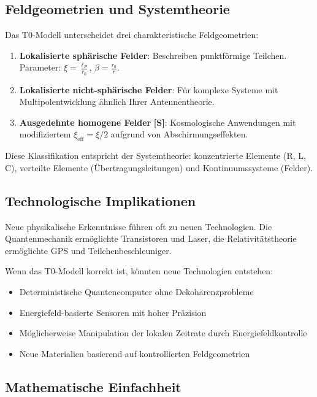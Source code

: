 \subsection{Feldgeometrien und Systemtheorie}

Das T0-Modell unterscheidet drei charakteristische Feldgeometrien:

\begin{enumerate}
	\item \textbf{Lokalisierte sphärische Felder}: Beschreiben punktförmige Teilchen. Parameter: $\xi = \frac{\ell_P}{r_0}$, $\beta = \frac{r_0}{r}$.
	\item \textbf{Lokalisierte nicht-sphärische Felder}: Für komplexe Systeme mit Multipolentwicklung ähnlich Ihrer Antennentheorie.
	\item \textbf{Ausgedehnte homogene Felder} \textbf{[S]}: Kosmologische Anwendungen mit modifiziertem $\xi_{\text{eff}} = \xi/2$ aufgrund von Abschirmungseffekten.
\end{enumerate}

Diese Klassifikation entspricht der Systemtheorie: konzentrierte Elemente (R, L, C), verteilte Elemente (Übertragungsleitungen) und Kontinuumssysteme (Felder).

\subsection{Technologische Implikationen}

Neue physikalische Erkenntnisse führen oft zu neuen Technologien. Die Quantenmechanik ermöglichte Transistoren und Laser, die Relativitätstheorie ermöglichte GPS und Teilchenbeschleuniger.

Wenn das T0-Modell korrekt ist, könnten neue Technologien entstehen:
\begin{itemize}
	\item Deterministische Quantencomputer ohne Dekohärenzprobleme
	\item Energiefeld-basierte Sensoren mit hoher Präzision
	\item Möglicherweise Manipulation der lokalen Zeitrate durch Energiefeldkontrolle
	\item Neue Materialien basierend auf kontrollierten Feldgeometrien
\end{itemize}

\subsection{Mathematische Einfachheit}

